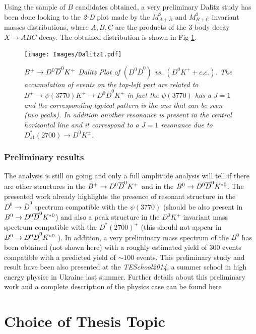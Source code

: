 \documentclass[paper=a4, fontsize=10pt]{scrartcl}
\numberwithin{equation}{section}		%
\numberwithin{figure}{section}			%
\numberwithin{table}{section}				%
\begin{document}
Using the sample of $B$ candidates obtained,  a very preliminary Dalitz study has been done looking to the \textit{2-D} plot made by the $M^{2}_{A+B}$ and $M^{2}_{B+C}$ invariant masses distributions, where $A,B,C$ are the products of the 3-body decay $X\rightarrow ABC$ decay. The obtained distribution is shown in Fig \ref{Dalitz}.
\begin{figure}[h!]
\begin{center}
\texttt{[image: Images/Dalitz1.pdf]}
\caption{\textit{$B^{+} \rightarrow D^0 \overline{D}^{0} K^{+}$ Dalitz Plot of $(D^{0}\overline{D}^{0})$ vs. $(D^{0}K^{+}+c.c.)$. The accumulation of events on the top-left part are related to $B^{+}\rightarrow \psi(3770)K^{+}\rightarrow D^{0}\overline{D}^{0} K^{+}$ in fact the $\psi(3770)$ has a $J=1$ and the corresponding typical pattern is the one that can be seen (two peaks). In addition another resonance is present in the central horizontal line and it correspond to a $J=1$ resonance due to $D^{*}_{s1}(2700)\rightarrow D^{0}K^{\pm}$.}}\label{Dalitz}
\end{center}
\end{figure}

\subsubsection{Preliminary results}
The analysis is still on going and only a full amplitude analysis will tell if there are other structures in the $B^{+} \rightarrow D^0 \overline{D}^{0} K^{+}$ and in the $B^{0} \rightarrow D^0 \overline{D}^{0} K^{\ast 0}$. The presented work already highlights the presence of resonant structure in the $D^{0} \rightarrow \overline{D} ^{0} $ spectrum compatible with the $\psi (3770)$ (should be also present in $B^{0} \rightarrow D^0 \overline{D}^{0} K^{\ast 0}$) and also a peak structure in the $D^{0} K^{+} $ invariant mass spectrum compatible with the $D^{*}(2700)^{+}$ (this should not appear in $B^{0} \rightarrow D^0 \overline{D}^{0} K^{\ast 0}$ ). In addition, a very preliminary mass spectrum of the $B^{0}$ has been obtained (not shown here) with a roughly estimated yield of 300 events compatible with a predicted yield of $\sim 100 $ events.
This preliminary study and result have been also presented at the \textit{TESchool2014}, a summer school in high energy physisc in Ukraine last summer.
Further details about this preliminary work and a complete description of the physics case can be found here ~\cite{Tesi}

\section{Choice of Thesis Topic}
\end{document}

